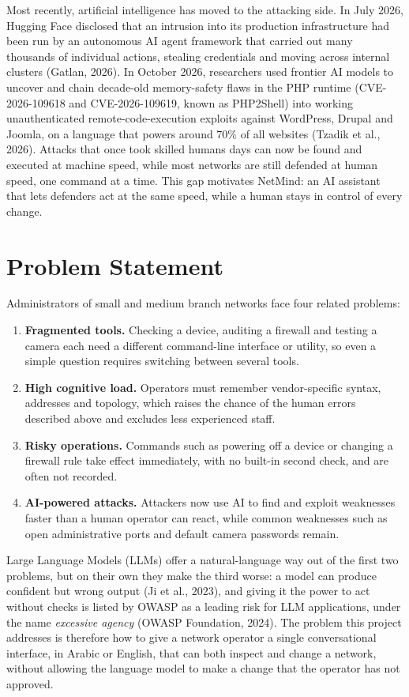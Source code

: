Most recently, artificial intelligence has moved to the attacking side. In
July 2026, Hugging Face disclosed that an intrusion into its production
infrastructure had been run by an autonomous AI agent framework that carried
out many thousands of individual actions, stealing credentials and moving
across internal clusters (Gatlan, 2026). In October 2026, researchers used
frontier AI models to uncover and chain decade-old memory-safety flaws in the
PHP runtime (CVE-2026-109618 and CVE-2026-109619, known as PHP2Shell) into
working unauthenticated remote-code-execution exploits against WordPress,
Drupal and Joomla, on a language that powers around 70\% of all websites
(Tzadik et al., 2026). Attacks that once took skilled humans days can now be
found and executed at machine speed, while most networks are still
defended at human speed, one command at a time. This gap motivates NetMind:
an AI assistant that lets defenders act at the same speed, while a human
stays in control of every change.

\section{Problem Statement}

Administrators of small and medium branch networks face four related
problems:

\begin{enumerate}[itemsep=2pt]
  \item \textbf{Fragmented tools.} Checking a device, auditing a firewall and
  testing a camera each need a different command-line interface or utility,
  so even a simple question requires switching between several tools.
  \item \textbf{High cognitive load.} Operators must remember vendor-specific
  syntax, addresses and topology, which raises the chance of the human errors
  described above and excludes less experienced staff.
  \item \textbf{Risky operations.} Commands such as powering off a device or
  changing a firewall rule take effect immediately, with no built-in second
  check, and are often not recorded.
  \item \textbf{AI-powered attacks.} Attackers now use AI to find and exploit
  weaknesses faster than a human operator can react, while common weaknesses
  such as open administrative ports and default camera passwords remain.
\end{enumerate}

Large Language Models (LLMs) offer a natural-language way out of the first
two problems, but on their own they make the third worse: a model can
produce confident but wrong output (Ji et al., 2023), and giving it the power
to act without checks is listed by OWASP as a leading risk for LLM
applications, under the name \emph{excessive agency} (OWASP Foundation,
2024). The problem this project addresses is therefore how to give a network
operator a single conversational interface, in Arabic or English, that can
both inspect and change a network, without allowing the language model to
make a change that the operator has not approved.

